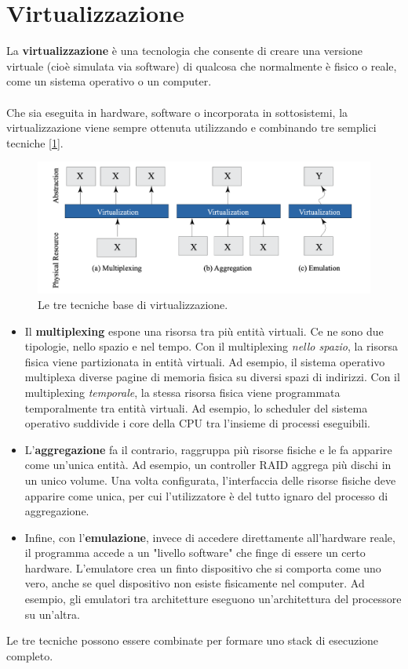 \section{Virtualizzazione}
La \textbf{virtualizzazione} è una tecnologia che consente di creare una versione virtuale (cioè simulata via software) di qualcosa che normalmente è fisico o reale, come un sistema operativo o un computer.
\\
\\
Che sia eseguita in hardware, software o incorporata in sottosistemi, la virtualizzazione viene
sempre ottenuta utilizzando e combinando tre semplici tecniche [\ref{fig:virtualiz}]. 
\begin{figure}[!h]
    \centering
    \includegraphics[width=0.6\linewidth]{img/virtualizzazione.png}
    \caption{Le tre tecniche base di virtualizzazione.}
    \label{fig:virtualiz}
\end{figure}
\begin{itemize}
	\item Il \textbf{multiplexing} espone una risorsa tra più entità virtuali. Ce ne sono due
	tipologie, nello spazio e nel tempo. Con il multiplexing \textit{nello spazio}, la risorsa
	fisica viene partizionata in entità virtuali. Ad esempio, il sistema operativo
	multiplexa diverse pagine di memoria fisica su diversi spazi di indirizzi. Con il multiplexing \textit{temporale}, la stessa risorsa fisica viene programmata temporalmente tra entità virtuali. Ad esempio, lo scheduler del sistema operativo suddivide i core della CPU tra l’insieme di processi eseguibili.
	\item L’\textbf{aggregazione} fa il contrario, raggruppa più risorse fisiche e le fa apparire come un'unica entità. Ad esempio, un controller RAID aggrega più dischi in un unico
	volume. Una volta configurata, l'interfaccia delle risorse fisiche deve apparire come unica, per cui l'utilizzatore è del tutto ignaro del processo di aggregazione.
	\item Infine, con l'\textbf{emulazione}, invece di accedere direttamente all'hardware reale, il programma accede a un "livello software" che finge di essere un certo hardware. L'emulatore crea un finto dispositivo che si comporta come uno vero, anche se quel dispositivo non esiste fisicamente nel computer. Ad esempio, gli emulatori tra architetture eseguono un’architettura del processore su un’altra.
\end{itemize}
Le tre tecniche possono essere combinate per formare uno stack di esecuzione completo.

